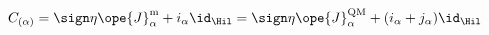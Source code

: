 \begin{equation}	\label{5.4}
C_{(\alpha)}
= \sign\eta \ope{J}_\alpha^{\mathrm{m}} + i_\alpha \id_\Hil
= \sign\eta \ope{J}_\alpha^{\mathrm{QM}} + (i_\alpha + j_\alpha) \id_\Hil
	\end{equation}

